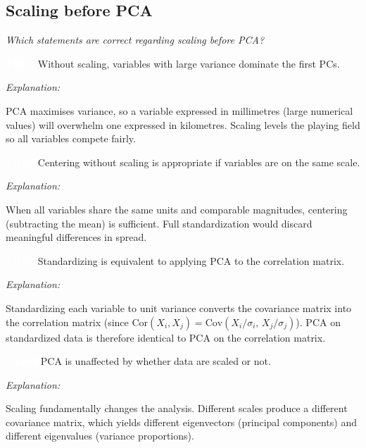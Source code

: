 \documentclass[12pt, a4paper]{article}
\newcommand{\truelabel}{\textcolor{white}{\colorbox{truegreen}{\textbf{TRUE}}}}
\newcommand{\falselabel}{\textcolor{white}{\colorbox{falsered}{\textbf{FALSE}}}}
\newenvironment{statement}[1]{%
  \par\medskip
  \noindent #1\par\smallskip
  \noindent
}{\par}
\newenvironment{explanation}{%
  \noindent\small\color{headergray}\textit{Explanation: }%
}{\par}
\begin{document}
\subsection{Scaling before PCA}

\textit{Which statements are correct regarding scaling before PCA?}

\bigskip

\begin{statement}{\truelabel\quad Without scaling, variables with large variance dominate the first PCs.}
\begin{explanation}
PCA maximises variance, so a variable expressed in millimetres (large numerical values) will overwhelm one expressed in kilometres. Scaling levels the playing field so all variables compete fairly.
\end{explanation}
\end{statement}

\begin{statement}{\truelabel\quad Centering without scaling is appropriate if variables are on the same scale.}
\begin{explanation}
When all variables share the same units and comparable magnitudes, centering (subtracting the mean) is sufficient. Full standardization would discard meaningful differences in spread.
\end{explanation}
\end{statement}

\begin{statement}{\truelabel\quad Standardizing is equivalent to applying PCA to the correlation matrix.}
\begin{explanation}
Standardizing each variable to unit variance converts the covariance matrix into the correlation matrix (since $\text{Cor}(X_i, X_j) = \text{Cov}(X_i/\sigma_i,\, X_j/\sigma_j)$). PCA on standardized data is therefore identical to PCA on the correlation matrix.
\end{explanation}
\end{statement}

\begin{statement}{\falselabel\quad PCA is unaffected by whether data are scaled or not.}
\begin{explanation}
Scaling fundamentally changes the analysis. Different scales produce a different covariance matrix, which yields different eigenvectors (principal components) and different eigenvalues (variance proportions).
\end{explanation}
\end{statement}
\end{document}
